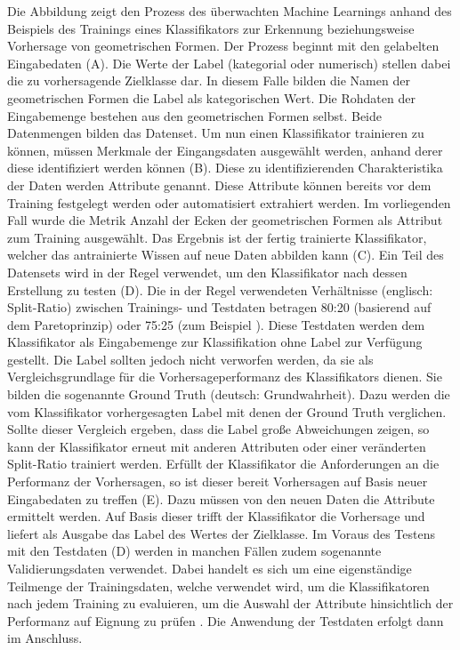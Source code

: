 Die Abbildung zeigt den Prozess des überwachten Machine Learnings anhand des Beispiels des Trainings eines Klassifikators zur Erkennung beziehungsweise Vorhersage von geometrischen Formen. Der Prozess beginnt mit den \glqq gelabelten\grqq{} Eingabedaten (A). Die Werte der Label (kategorial oder numerisch) stellen dabei die zu vorhersagende Zielklasse dar. In diesem Falle bilden die Namen der geometrischen Formen die Label als kategorischen Wert. Die Rohdaten der Eingabemenge bestehen aus den geometrischen Formen selbst. Beide Datenmengen bilden das Datenset. Um nun einen Klassifikator trainieren zu können, müssen Merkmale der Eingangsdaten ausgewählt werden, anhand derer diese identifiziert werden können (B). Diese zu identifizierenden Charakteristika der Daten werden Attribute genannt. Diese Attribute können bereits vor dem Training festgelegt werden oder automatisiert extrahiert werden. Im vorliegenden Fall wurde die Metrik \glqq Anzahl der Ecken der geometrischen Formen\grqq{} als Attribut zum Training ausgewählt. Das Ergebnis ist der fertig trainierte Klassifikator, welcher das antrainierte Wissen auf neue Daten abbilden kann (C). Ein Teil des Datensets wird in der Regel verwendet, um den Klassifikator nach dessen Erstellung zu testen (D). Die in der Regel verwendeten Verhältnisse (englisch: Split-Ratio) zwischen Trainings- und Testdaten betragen 80:20 (basierend auf dem Paretoprinzip) oder 75:25 (zum Beispiel \cite{Queiroz2016}). Diese Testdaten werden dem Klassifikator als Eingabemenge zur Klassifikation ohne Label zur Verfügung gestellt. Die Label sollten jedoch nicht verworfen werden, da sie als Vergleichsgrundlage für die Vorhersageperformanz des Klassifikators dienen. Sie bilden die sogenannte \glqq Ground Truth\grqq{} (deutsch: Grundwahrheit). Dazu werden die vom Klassifikator vorhergesagten Label mit denen der Ground Truth verglichen. Sollte dieser Vergleich ergeben, dass die Label große Abweichungen zeigen, so kann der Klassifikator erneut mit anderen Attributen oder einer veränderten Split-Ratio trainiert werden. Erfüllt der Klassifikator die Anforderungen an die Performanz der Vorhersagen, so ist dieser bereit Vorhersagen auf Basis neuer Eingabedaten zu treffen (E). Dazu müssen von den neuen Daten die Attribute ermittelt werden. Auf Basis dieser trifft der Klassifikator die Vorhersage und liefert als Ausgabe das Label des Wertes der Zielklasse. Im Voraus des Testens mit den Testdaten (D) werden in manchen Fällen zudem sogenannte Validierungsdaten verwendet. Dabei handelt es sich um eine eigenständige Teilmenge der Trainingsdaten, welche verwendet wird, um die Klassifikatoren nach jedem Training zu evaluieren, um die Auswahl der Attribute hinsichtlich der Performanz auf Eignung zu prüfen \cite{Sammut2017}. Die Anwendung der Testdaten erfolgt dann im Anschluss.


